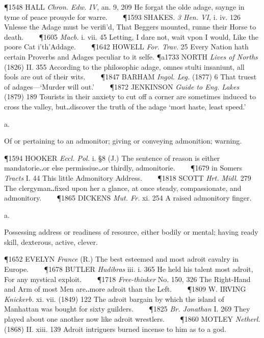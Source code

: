 \begin{description}[wide, labelwidth=!, labelindent=0pt]
\P 1548 HALL \textit{Chron. Edw. IV}, an. 9, 209 He forgat the olde adage, saynge in tyme of peace prouyde for warre.    
\P 1593 SHAKES. \textit{3 Hen. VI,} i. iv. 126 Vnlesse the Adage must be verifi'd, That Beggers mounted, runne their Horse to death.    
\P 1605 \textit{Macb.} i. vii. 45 Letting, I dare not, wait vpon I would, Like the poore Cat i'th'Addage.    
\P 1642 HOWELL \textit{For. Trav.} 25 Every Nation hath certain Proverbs and Adages peculiar to it selfe.
\P a1733 NORTH \textit{Lives of Norths} (1826) II. 355 According to the philosophic adage, omnes stulti insaniunt, all fools are out of their wits.    
\P 1847 BARHAM \textit{Ingol. Leg.} (1877) 6 That truest of adages—‘Murder will out.’    
\P 1872 JENKINSON \textit{Guide to Eng. Lakes} (1879) 189 Tourists in their anxiety to cut off a corner are sometimes induced to cross the valley, but‥discover the truth of the adage ‘most haste, least speed.’


  a.

\noindent  {}


\noindent Of or pertaining to an admonitor; giving or conveying admonition; warning. 

\P 1594 HOOKER \textit{Eccl. Pol.} i. §8 (J.) The sentence of reason is either mandatorie‥or else permissiue‥or thirdly, admonitorie.    
\P 1679 in Somers \textit{Tracts} I. 44 This little Admonitory Address.    
\P 1818 SCOTT \textit{Hrt. Midl.} 279 The clergyman‥fixed upon her a glance, at once steady, compassionate, and admonitory.    
\P 1865 DICKENS \textit{Mut. Fr.} xi. 254 A raised admonitory finger.

  a.

\noindent  {}


\noindent Possessing address or readiness of resource, either bodily or mental; having ready skill, dexterous, active, clever. 

\P 1652 EVELYN \textit{France} (R.) The best esteemed and most adroit cavalry in Europe.    
\P 1678 BUTLER \textit{Hudibras} iii. i. 365 He held his talent most adroit, For any mystical exploit.    
\P 1718 \textit{Free-thinker} No. 150, 326 The Right-Hand and Arm of most Men are‥more adroit than the Left.    
\P 1809 W. IRVING \textit{Knickerb.} xi. vii. (1849) 122 The adroit bargain by which the island of Manhattan was bought for sixty guilders.    
\P 1825 \textit{Br. Jonathan} I. 269 They played about one another now like adroit wrestlers.    
\P 1860 MOTLEY \textit{Netherl.} (1868) II. xiii. 139 Adroit intriguers burned incense to him as to a god.


\end{description}
